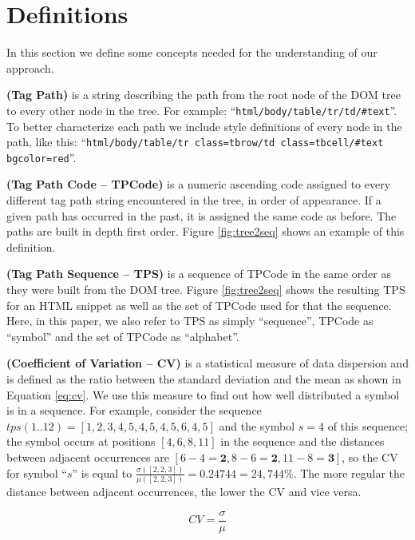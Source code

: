 \documentclass{vldb}
\begin{document}
\section{Definitions}\label{sec:defs}
In this section we define some concepts needed for the understanding of our approach.

\begin{definition}\textbf{(Tag Path)} is a string describing the path from the
root node of the DOM tree to every other node in the tree. For example:
``\texttt{html/body/table/tr/td/\#text}''. To better characterize each path we
include style definitions of every node in the path, like this:
``\texttt{html/body/table/tr class=tbrow/td class=tbcell/\#text bgcolor=red}''.
\end{definition}

\begin{definition}\textbf{(Tag Path Code -- TPCode)}\label{def:tpc} is a numeric
ascending code assigned to every different tag path string encountered in the tree, in order of
appearance. If a given path has occurred in the past, it is assigned the same
code as before. The paths are built in depth first order. Figure
\ref{fig:tree2seq} shows an example of this definition.
\end{definition}

\begin{definition}\textbf{(Tag Path Sequence -- TPS)} is a sequence of TPCode in
the same order as they were built from the DOM tree. Figure \ref{fig:tree2seq} shows
the resulting TPS for an HTML snippet as  well as the set of TPCode used for that
the sequence. Here, in this paper, we also refer to TPS as simply ``sequence'',
TPCode as ``symbol'' and the set of TPCode as ``alphabet''.
\end{definition}

\begin{definition}\textbf{(Coefficient of Variation -- CV)}\label{def:cv} is a
statistical measure of data dispersion and is defined as the ratio between the standard
deviation and the mean as shown in Equation \ref{eq:cv}. We use this measure to
find out how well distributed a symbol is in a sequence. For example, consider
the sequence $tps(1..12)=[1,2,3,4,5,4,5,4,5,6,4,5]$ and the symbol $s=4$ of this
sequence; the symbol occurs at positions $[4,6,8,11]$ in the sequence and the
distances between adjacent occurrences are
$[6-4=\textbf{2},8-6=\textbf{2},11-8=\textbf{3}]$, so the CV for symbol ``$s$''
is equal to $\frac{\sigma([2, 2, 3])}{\mu([2, 2, 3])}=0.24744=24,744\%$. The more
regular the distance between adjacent occurrences, the lower the CV and vice
versa.

\begin{equation}\label{eq:cv}
    CV=\frac{\sigma}{\mu}
\end{equation}
\end{definition}
\end{document}
